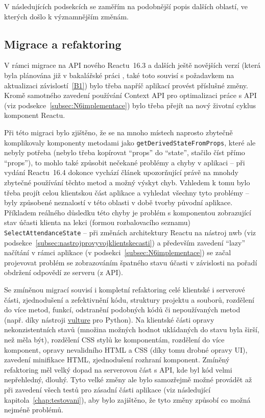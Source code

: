 V následujících podsekcích se zaměřím na podobnější popis dalších oblastí, ve kterých došlo k významnějším změnám.

\subsection{Migrace a refaktoring}
V rámci migrace na API nového Reactu~16.3 a dalších ještě novějších verzí (která byla plánována již v bakalářské práci \cite{bp}, také toto souvisí s požadavkem na aktualizaci závislostí~\ref{B1}) bylo třeba napříč aplikací provést příslušné změny. Kromě samotného zavedení používání Context API pro optimalizaci práce s API (viz podsekce~\ref{subsec:N6implementace}) bylo třeba přejít na nový životní cyklus komponent Reactu.

Při této migraci bylo zjištěno, že se na mnoho místech naprosto zbytečně komplikovaly komponenty metodami jako \verb|getDerivedStateFromProps|, které ale nebyly potřeba (nebylo třeba kopírovat \enquote{props} do \enquote{state}, stačilo číst přímo \enquote{props}), to mohlo také způsobit nečekané problémy a chyby v aplikaci -- při vydání Reactu~16.4 dokonce vychází článek \cite{react-blog-derivedstate} upozorňující právě na mnohdy zbytečné používání těchto metod a možný výskyt chyb. Vzhledem k tomu bylo třeba projít celou klientskou část aplikace a vyhledat všechny tyto problémy -- byly způsobené neznalostí v této oblasti v době tvorby původní aplikace. Příkladem reálného důsledku této chyby je problém s komponentou zobrazující stav účasti klienta na lekci (formou rozbalovacího seznamu) \verb|SelectAttendanceState| -- při změnách architektury Reactu na nástroj nwb (viz podsekce~\ref{subsec:nastrojprovyvojklientskecasti}) a především zavedení \enquote{lazy} načítání v rámci aplikace (v podsekci~\ref{subsec:N6implementace}) se začal projevovat problém se zobrazováním špatného stavu účasti v závislosti na pořadí obdržení odpovědí ze serveru (z API).

Se zmíněnou migrací souvisí i kompletní refaktoring celé klientské i serverové části, zjednodušení a zefektivnění kódu, struktury projektu a souborů, rozdělení do více metod, funkcí, odstranění podobných kódů či nepoužívaných metod (např. díky nástroji \href{https://github.com/jendrikseipp/vulture/}{vulture} pro Python). Na klientské části opravy nekonzistentních stavů (množina možných hodnot ukládaných do stavu byla širší, než měla být), rozdělení CSS stylů ke komponentám, rozdělení do více komponent, opravy nevalidního HTML a CSS (díky tomu drobné opravy UI), zavedení minifikace HTML, zjednodušení rozhraní komponent. Zmíněný refaktoring měl velký dopad na serverovou část s API, kde byl kód velmi nepřehledný, dlouhý. Tyto velké změny ale bylo samozřejmě možné provádět až při zavedení všech testů pro zásadní části aplikace (viz následující kapitola~\ref{chap:testovani}), aby bylo zajištěno, že tyto změny způsobí co možná nejméně problémů.

